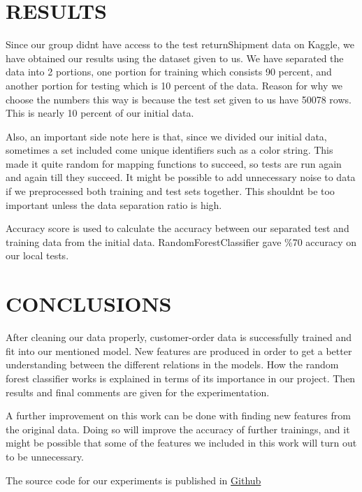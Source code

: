 \documentclass[a4paper, 10pt, conference]{ieeeconf}
\begin{document}
\section{RESULTS}

Since our group didnt have access to the test returnShipment data on Kaggle, we have obtained our results using the dataset given to us. We have separated the data into 2 portions, one portion for training which consists 90 percent, and another portion for testing which is 10 percent of the data. Reason for why we choose the numbers this way is because the test set given to us have 50078 rows. This is nearly 10 percent of our initial data.

Also, an important side note here is that, since we divided our initial data, sometimes a set included come unique identifiers such as a color string. This made it quite random for mapping functions to succeed, so tests are run again and again till they succeed. It might be possible to add unnecessary noise to data if we preprocessed both training and test sets together. This shouldnt be too important unless the data separation ratio is high.

Accuracy score is used to calculate the accuracy between our separated test and training data from the initial data. RandomForestClassifier gave \%70 accuracy on our local tests.

\section{CONCLUSIONS}

After cleaning our data properly, customer-order data is successfully trained and fit into our mentioned model. New features are produced in order to get a better understanding between the different relations in the models. How the random forest classifier works is explained in terms of its importance in our project. Then results and final comments are given for the experimentation.

A further improvement on this work can be done with finding new features from the original data. Doing so will improve the accuracy of further trainings, and it might be possible that some of the features we included in this work will turn out to be unnecessary.

The source code for our experiments is published in \href{https://github.com/mastizada/lfd2018/}{Github}



\end{document}
